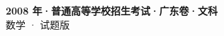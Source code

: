 \documentclass[zihao=-4, a4paper]{ctexart}
\begin{document}
\begin{center}
  {\Large\bfseries 2008 年·普通高等学校招生考试·广东卷·文科}\\[4pt]
  {\large 数学 · 试题版}
\end{center}
\medskip
{}

\end{document}
